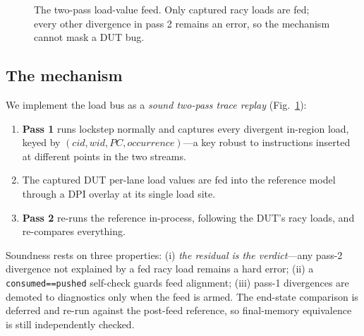 \documentclass[conference]{IEEEtran}
\newcommand{\code}[1]{\texttt{\small #1}}
\begin{document}
\begin{figure}[t]
\centering
{}
\caption{The two-pass load-value feed. Only captured racy loads are
fed; every other divergence in pass 2 remains an error, so the
mechanism cannot mask a DUT bug.}
\label{fig:feed}
\end{figure}

\subsection{The mechanism}
We implement the load bus as a \emph{sound two-pass trace replay}
(Fig.~\ref{fig:feed}):
\begin{enumerate}
\item \textbf{Pass 1} runs lockstep normally and captures every
divergent in-region load, keyed by
$(\textit{cid}, \textit{wid}, \textit{PC}, \textit{occurrence})$---a
key robust to instructions inserted at different points in the two
streams.
\item The captured DUT per-lane load values are fed into the reference
model through a DPI overlay at its single load site.
\item \textbf{Pass 2} re-runs the reference in-process, following the
DUT's racy loads, and re-compares everything.
\end{enumerate}
Soundness rests on three properties: (i) \emph{the residual is the
verdict}---any pass-2 divergence not explained by a fed racy load
remains a hard error; (ii) a \code{consumed==pushed} self-check guards
feed alignment; (iii) pass-1 divergences are demoted to diagnostics
only when the feed is armed. The end-state comparison is deferred and
re-run against the post-feed reference, so final-memory equivalence is
still independently checked.
\end{document}
